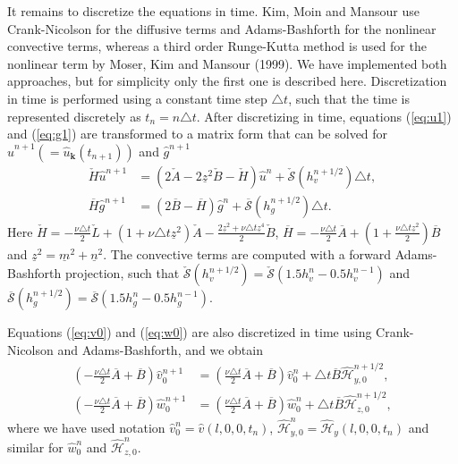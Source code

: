 \documentclass[11pt, oneside]{article}
\newcommand{\N}[1]{\check{#1}}
\newcommand{\D}[1]{\overline{#1}}
\begin{document}
It remains to discretize the equations in time. Kim, Moin and Mansour use 
Crank-Nicolson for the diffusive terms and Adams-Bashforth for the nonlinear 
convective terms, whereas a third order Runge-Kutta method is used for the 
nonlinear term by Moser, Kim and Mansour (1999). We have implemented both 
approaches, but for simplicity only the first one is described here. 
Discretization in time is performed using a constant time step $\triangle t$, 
such that the time is represented discretely as $t_n = n \triangle t$. After 
discretizing in time, equations (\ref{eq:u1}) and (\ref{eq:g1}) are transformed 
to a matrix form that can be solved for $\hat{u}^{n+1} (= 
\hat{u}_{\bm{k}}(t_{n+1}))$ and $\hat{g}^{n+1}$
\begin{align}
\N{H}\hat{u}^{n+1} & = \left(2\N{A} - 2\underline{z}^2\N{B} - \N{H} 
\right)\hat{u}^{n} + \N{\mathcal{S}}(h_v^{n+1/2}) \triangle t, 
\label{eq:ufin}\\ 
\D{H} \hat{g}^{n+1} &= \left(2 \D{B}-\D{H}\right) 
\hat{g}^{n} + \D{\mathcal{S}}(h_g^{n+1/2}) \triangle t. \label{eq:gfin}
\end{align}
Here $\N{H} = -\frac{\nu \triangle t}{2}\N{L} + \left( 1 + \nu \triangle t 
\underline{z}^2 \right) \N{A} - \frac{2\underline{z}^2 + \nu \triangle t 
\underline{z}^4}{2} \N{B}$, $\D{H} = -\frac{\nu \triangle t}{2}\D{A} + (1 + 
\frac{\nu \triangle t \underline{z}^2}{2}) \D{B}$ and $\underline{z}^2 = 
\underline{m}^2 + \underline{n}^2$. The convective terms are computed with 
a forward Adams-Bashforth projection, such that $\N{\mathcal{S}}(h_v^{n+1/2}) = 
\N{\mathcal{S}}(1.5h_v^{n} - 0.5 h_v^{n-1})$ and $\D{\mathcal{S}}(h_g^{n+1/2}) 
= \D{\mathcal{S}}(1.5h_g^{n} - 0.5 h_g^{n-1})$.

Equations (\ref{eq:v0}) and (\ref{eq:w0}) are also discretized in time using 
Crank-Nicolson and Adams-Bashforth, and we obtain
\begin{align}
\left(-\frac{\nu \triangle t}{2}\D{A} + \D{B} \right)\hat{v}_0^{n+1} &= 
\left(\frac{\nu \triangle t}{2}\D{A} + \D{B} 
\right)\hat{v}^{n}_0 + \triangle t\D{B}\hat{\mathcal{H}}_{y,0}^{n+1/2} , 
\label{eq:v00} \\
\left(-\frac{\nu \triangle t}{2}\D{A} + \D{B} \right)\hat{w}_0^{n+1} &= 
\left(\frac{\nu \triangle t}{2}\D{A} + \D{B} 
\right)\hat{w}^{n}_0 + \triangle t\D{B}\hat{\mathcal{H}}_{z,0}^{n+1/2}, 
\label{eq:w00}
\end{align}
where we have used notation $\hat{v}^{n}_0 = \hat{v}(l, 0, 0, t_n)$, 
$\hat{\mathcal{H}}^{n}_{y,0} = \hat{\mathcal{H}}_y(l, 0, 0, t_n)$ and similar 
for $\hat{w}^n_0$ and $\hat{\mathcal{H}}^n_{z,0}$.
\end{document}
